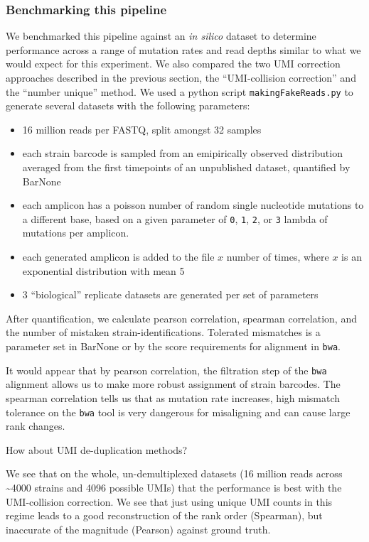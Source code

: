 {\subsubsection{Benchmarking this
pipeline}\label{benchmarking-this-pipeline}

We benchmarked this pipeline against an \emph{in silico} dataset to
determine performance across a range of mutation rates and read depths
similar to what we would expect for this experiment. We also compared
the two UMI correction approaches described in the previous section, the
``UMI-collision correction'' and the ``number unique'' method. We used a
python script \texttt{makingFakeReads.py} to generate several datasets
with the following parameters:

\begin{itemize}
\tightlist
\item
  16 million reads per FASTQ, split amongst 32 samples
\item
  each strain barcode is sampled from an emipirically observed
  distribution averaged from the first timepoints of an unpublished
  dataset, quantified by BarNone
\item
  each amplicon has a poisson number of random single nucleotide
  mutations to a different base, based on a given parameter of
  \texttt{0}, \texttt{1}, \texttt{2}, or \texttt{3} lambda of mutations
  per amplicon.
\item
  each generated amplicon is added to the file \(x\) number of times,
  where \(x\) is an exponential distribution with mean 5
\item
  3 ``biological'' replicate datasets are generated per set of
  parameters
\end{itemize}

After quantification, we calculate pearson correlation, spearman
correlation, and the number of mistaken strain-identifications.
Tolerated mismatches is a parameter set in BarNone or by the score
requirements for alignment in \texttt{bwa}.

It would appear that by pearson correlation, the filtration step of the
\texttt{bwa} alignment allows us to make more robust assignment of
strain barcodes. The spearman correlation tells us that as mutation rate
increases, high mismatch tolerance on the \texttt{bwa} tool is very
dangerous for misaligning and can cause large rank changes.

How about UMI de-duplication methods?

We see that on the whole, un-demultiplexed datasets (16 million reads
across \textasciitilde{}4000 strains and 4096 possible UMIs) that the
performance is best with the UMI-collision correction. We see that just
using unique UMI counts in this regime leads to a good reconstruction of
the rank order (Spearman), but inaccurate of the magnitude (Pearson)
against ground truth.

}
